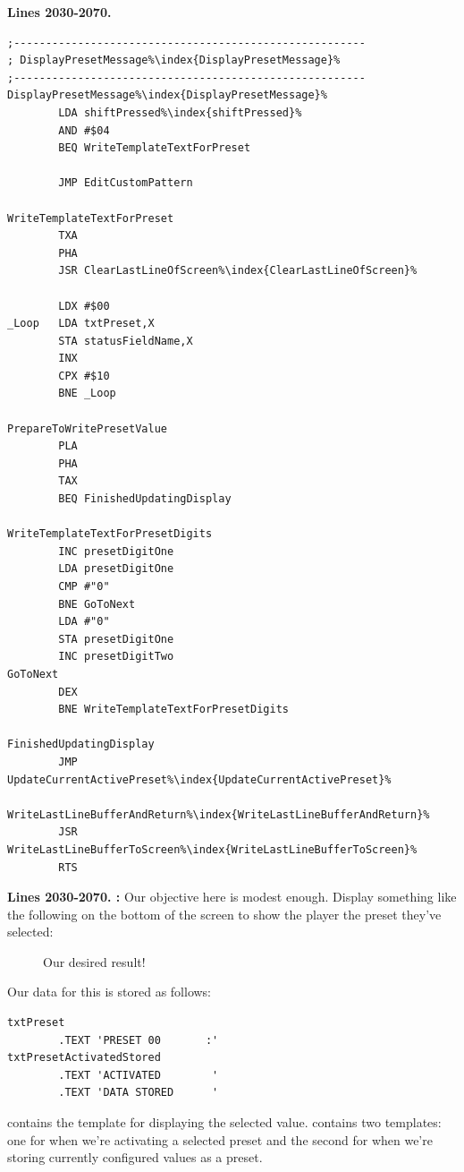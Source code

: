\clearpage
\textbf{Lines 2030-2070. } 
\begin{lstlisting}[escapechar=\%]
;-------------------------------------------------------
; DisplayPresetMessage%\index{DisplayPresetMessage}%
;-------------------------------------------------------
DisplayPresetMessage%\index{DisplayPresetMessage}%    
        LDA shiftPressed%\index{shiftPressed}%
        AND #$04
        BEQ WriteTemplateTextForPreset

        JMP EditCustomPattern

WriteTemplateTextForPreset
        TXA 
        PHA 
        JSR ClearLastLineOfScreen%\index{ClearLastLineOfScreen}%

        LDX #$00
_Loop   LDA txtPreset,X
        STA statusFieldName,X
        INX 
        CPX #$10
        BNE _Loop

PrepareToWritePresetValue
        PLA 
        PHA 
        TAX 
        BEQ FinishedUpdatingDisplay

WriteTemplateTextForPresetDigits   
        INC presetDigitOne
        LDA presetDigitOne
        CMP #"0"
        BNE GoToNext
        LDA #"0"
        STA presetDigitOne
        INC presetDigitTwo
GoToNext   
        DEX 
        BNE WriteTemplateTextForPresetDigits

FinishedUpdatingDisplay   
        JMP UpdateCurrentActivePreset%\index{UpdateCurrentActivePreset}%

WriteLastLineBufferAndReturn%\index{WriteLastLineBufferAndReturn}%    
        JSR WriteLastLineBufferToScreen%\index{WriteLastLineBufferToScreen}%
        RTS 
\end{lstlisting}
\clearpage

\textbf{Lines 2030-2070. :} Our objective here is modest enough. Display something like the following
on the bottom of the screen to show the player the preset they've selected:
\begin{figure}[H]                                                          
  \centering                                                             
\caption{Our desired result!}
\end{figure}                                                               
\vspace*{-0.7cm}
Our data for this is stored as follows:
\begin{lstlisting}[escapechar=\%]
txtPreset
        .TEXT 'PRESET 00       :'
txtPresetActivatedStored
        .TEXT 'ACTIVATED        '
        .TEXT 'DATA STORED      '
\end{lstlisting}
 contains the template for displaying the selected value.  contains two templates: one for
when we're activating a selected preset and the second for when we're storing currently configured values as a preset.


